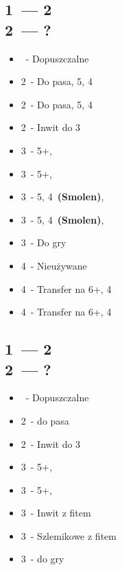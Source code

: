 \documentclass[12pt, a4paper]{article}
\begin{document}
    \subsection{1\ntx\ --- 2\clubs \\ 2\diams\ --- ?}
    \begin{itemize}
        \item \pass\ - Dopuszczalne
        \item 2\hearts\ - Do pasa, 5\hearts, 4\spades
        \item 2\spades\ - Do pasa, 5\spades, 4\hearts
        \item 2\nt\ - Inwit do 3\nt \br
        \item 3\clubs\ - 5+\clubs, \gf
        \item 3\diams\ - 5+\clubs, \gf 
        \item 3\hearts\ - 5\spades, 4\hearts\ \textbf{(Smolen)}, \gf
        \item 3\spades\ - 5\hearts, 4\spades\ \textbf{(Smolen)}, \gf
        \item 3\nt\ - Do gry \br
        \item 4\clubs\ - Nieużywane
        \item 4\diams\ - Transfer na 6+\hearts, 4\spades 
        \item 4\hearts\ - Transfer na 6+\spades, 4\hearts
    \end{itemize}

    \subsection{1\ntx\ --- 2\clubs \\ 2\hearts\ --- ?}
    \begin{itemize}
        \item \pass\ - Dopuszczalne
        \item 2\spades\ - do pasa
        \item 2\nt\ - Inwit do 3\nt \br
        \item 3\clubs\ - 5+\clubs, \gf
        \item 3\diams\ - 5+\diams, \gf 
        \item 3\hearts\ - Inwit z fitem \hearts
        \item 3\spades\ - Szlemikowe z fitem \hearts
        \item 3\nt\ - do gry
    \end{itemize}
\end{document}
